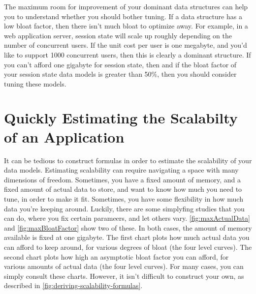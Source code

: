 The maximum room for improvement of your dominant data structures can help you
to understand whether you should bother tuning. If a data structure has a low bloat
factor, then there isn't much bloat to optimize away. For example, in a web
application server, session state will scale up roughly depending on the number
of concurrent users. If the unit cost per user is one megabyte, and you'd like
to support 1000 concurrent users, then this is clearly a dominant structure. If
you can't afford one gigabyte for session state, then and if the bloat factor of
your session state data models is greater than 50\%, then you should consider
tuning these models.

\section{Quickly Estimating the Scalabilty of an Application}

It can be tedious to construct formulas in order to estimate the scalability of
your data models. Estimating scalability can require navigating a space with
many dimensions of freedom. Sometimes, you have a fixed amount of memory, and a
fixed amount of actual data to store, and want to know how much you need to
tune, in order to make it fit. Sometimes, you have some flexibility in how much
data you're keeping around. Luckily, there are some simplyfing studies that you
can do, where you fix certain parameers, and let others vary.
\autoref{fig:maxActualData} and \autoref{fig:maxBloatFactor} show two of these.
In both cases, the amount of memory available is fixed at one gigabyte. The
first chart plots how much actual data you can afford to keep around, for
various degrees of bloat (the four level curves). The second chart plots how
high an asymptotic bloat factor you can afford, for various amounts of actual
data (the four level curves). For many cases, you can simply consult these
charts. However, it isn't difficult to construct your own, as described in
\autoref{fig:deriving-scalability-formulas}.


